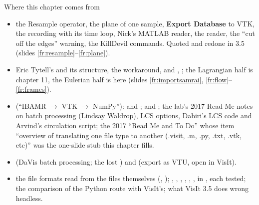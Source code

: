 \documentclass[aspectratio=169,11pt]{beamer}
\newcommand{\gui}[1]{\textsf{\textbf{#1}}}
\begin{document}
\begin{frame}{Where this chapter comes from}
\label{fr:sources}
\scriptsize
\begin{itemize}
  \item {} the Resample operator, the plane of one sample, \gui{Export Database} to VTK, the  recording with its time loop, Nick's MATLAB reader, the  reader, the ``cut off the edges'' warning, the KillDevil commands. Quoted and redone in 3.5 (slides \ref{fr:resample}--\ref{fr:plane}).
  \item {} Eric Tytell's  and its  structure, the  workaround,  and , ; the Lagrangian half is chapter 11, the Eulerian half is here (slides \ref{fr:importsamrai}, \ref{fr:flow}--\ref{fr:frames}).
  \item {} (``IBAMR $\to$ VTK $\to$ NumPy''):  and ;   and ; the lab's 2017 Read Me notes on batch processing (Lindsay Waldrop), LCS options, Dabiri's LCS code and Arvind's circulation script; the 2017 ``Read Me and To Do'' whose item ``overview of translating one file type to another (.visit, .m, .py, .txt, .vtk, etc)'' was the one-slide stub this chapter fills.
  \item {} (DaVis batch processing; the lost ) and  (export as VTU, open in VisIt).
  \item {} the file formats read from the files themselves (, ); , , , , , ,  in , each tested; the comparison of the Python route with VisIt's; what VisIt 3.5 does wrong headless.
\end{itemize}
\end{frame}
\end{document}
